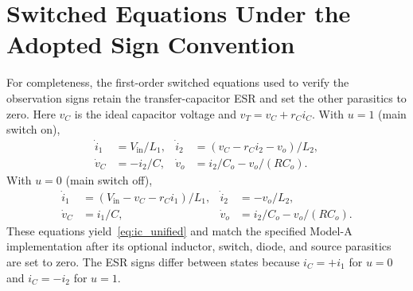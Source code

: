 \section{Switched Equations Under the Adopted Sign Convention}
\label{app:equations}

For completeness, the first-order switched equations used to verify the observation signs retain the transfer-capacitor ESR and set the other parasitics to zero. Here $v_C$ is the ideal capacitor voltage and $v_T=v_C+r_Ci_C$. With $u=1$ (main switch on),
\begin{align}
\dot i_1&=V_{\mathrm{in}}/L_1, &
\dot i_2&=(v_C-r_Ci_2-v_o)/L_2,\\
\dot v_C&=-i_2/C, &
\dot v_o&=i_2/C_o-v_o/(RC_o).
\end{align}
With $u=0$ (main switch off),
\begin{align}
\dot i_1&=(V_{\mathrm{in}}-v_C-r_Ci_1)/L_1, &
\dot i_2&=-v_o/L_2,\\
\dot v_C&=i_1/C, &
\dot v_o&=i_2/C_o-v_o/(RC_o).
\end{align}
These equations yield~\eqref{eq:ic_unified} and match the specified Model-A implementation after its optional inductor, switch, diode, and source parasitics are set to zero. The ESR signs differ between states because $i_C=+i_1$ for $u=0$ and $i_C=-i_2$ for $u=1$.

